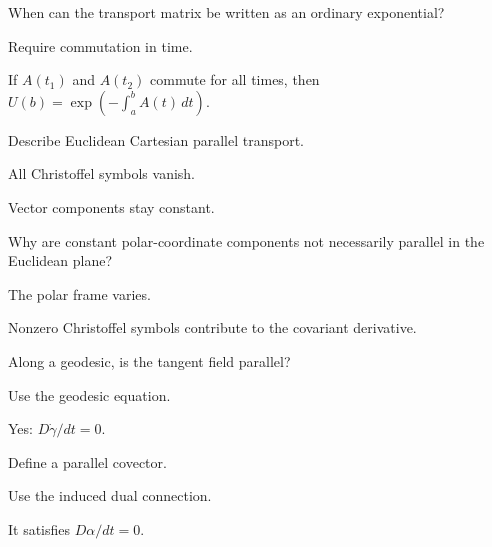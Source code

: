 \begin{exercise}\label{exr:vii24-14}
When can the transport matrix be written as an ordinary exponential?
\end{exercise}
\begin{hint}
Require commutation in time.
\end{hint}
\begin{solution}
If \(A(t_1)\) and \(A(t_2)\) commute for all times, then \(U(b)=\exp(-\int_a^bA(t)\,dt)\).
\end{solution}


\begin{exercise}\label{exr:vii24-15}
Describe Euclidean Cartesian parallel transport.
\end{exercise}
\begin{hint}
All Christoffel symbols vanish.
\end{hint}
\begin{solution}
Vector components stay constant.
\end{solution}


\begin{exercise}\label{exr:vii24-16}
Why are constant polar-coordinate components not necessarily parallel in the Euclidean plane?
\end{exercise}
\begin{hint}
The polar frame varies.
\end{hint}
\begin{solution}
Nonzero Christoffel symbols contribute to the covariant derivative.
\end{solution}


\begin{exercise}\label{exr:vii24-17}
Along a geodesic, is the tangent field parallel?
\end{exercise}
\begin{hint}
Use the geodesic equation.
\end{hint}
\begin{solution}
Yes: \(D\dot\gamma/dt=0\).
\end{solution}


\begin{exercise}\label{exr:vii24-18}
Define a parallel covector.
\end{exercise}
\begin{hint}
Use the induced dual connection.
\end{hint}
\begin{solution}
It satisfies \(D\alpha/dt=0\).
\end{solution}



